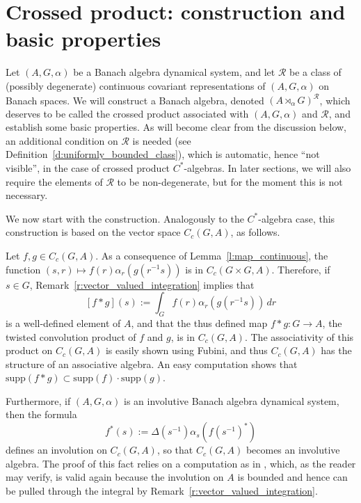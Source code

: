\documentclass{amsart}
\theoremstyle{plain}
\theoremstyle{definition}
\numberwithin{equation}{section}
\begin{document}
\section{Crossed product: construction and basic properties}\label{sec:construction_and_basic_properties}

Let ${(A,G,\alpha)}$ be a Banach algebra dynamical system, and let ${\mathcal R}$ be a class of (possibly degenerate) continuous covariant representations of ${(A,G,\alpha)}$ on Banach spaces. We will construct a Banach algebra, denoted ${(A {\rtimes}_\alpha G)^\mathcal{R}}$, which deserves to be called the crossed product associated with ${(A,G,\alpha)}$ and ${\mathcal R}$, and establish some basic properties. As will become clear from the discussion below, an additional condition on ${\mathcal R}$ is needed (see Definition~\ref{d:uniformly_bounded_class}), which is automatic, hence ``not visible'', in the case of crossed product $C^*$-algebras. In later sections, we will also require the elements of ${\mathcal R}$ to be non-degenerate, but for the moment this is not necessary.

We now start with the construction. Analogously to the $C^*$-algebra case, this construction is based on the vector space $C_c(G,A)$, as follows.

Let $f,g\in C_c(G,A)$. As a consequence of Lemma~\ref{l:map_continuous}, the function $(s,r) \mapsto f(r) \alpha_r(g(r^{-1}s))$ is in $C_c(G \times G, A)$. Therefore, if $s\in G$, Remark~\ref{r:vector_valued_integration} implies that
\[ [f * g](s):= \int_G f(r)\alpha_r(g(r^{-1}s)) \,dr \]
is a well-defined element of $A$, and that the thus defined map $f*g:G\to A$, the twisted convolution product of $f$ and $g$, is in $C_c(G,A)$. The associativity of this product on $C_c(G,A)$ is easily shown using Fubini, and thus $C_c(G,A)$ has the structure of an associative algebra. An easy computation shows that ${\text{supp}}(f * g) \subset {\text{supp}}(f) \cdot {\text{supp}}(g)$.

Furthermore, if ${(A,G,\alpha)}$ is an involutive Banach algebra dynamical system, then the formula
\begin{equation}\label{e:involution_definition}
f^*(s) := \Delta(s^{-1}) \alpha_s (f(s^{-1})^*)
\end{equation}
defines an involution on $C_c(G,A)$, so that $C_c(G,A)$ becomes an involutive algebra. The proof of this fact relies on a computation as in \cite[page~48]{williams}, which, as the reader may verify, is valid again because the involution on $A$ is bounded and hence can be pulled through the integral by Remark~\ref{r:vector_valued_integration}.
\end{document}
